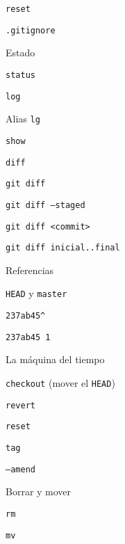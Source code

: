 \begin{longenum}
\begin{longenum}
\begin{longenum}
            \item \texttt{reset}
            \item \texttt{.gitignore}
        \end{longenum}
        \item Estado
        \begin{longenum}
            \item \texttt{status}
            \item \texttt{log}
            \item Alias \texttt{lg}
            \item \texttt{show}
            \item \texttt{diff}
            \begin{longenum}
                \item \texttt{git diff}
                \item \texttt{git diff --staged}
                \item \texttt{git diff <commit>}
                \item \texttt{git diff inicial..final}
            \end{longenum}
            \item Referencias
            \begin{longenum}
                \item \texttt{HEAD} y \texttt{master}
                \item \texttt{237ab45\^}
                \item \texttt{237ab45~1}
            \end{longenum}
        \end{longenum}
        \item La máquina del tiempo
        \begin{longenum}
            \item \texttt{checkout} (mover el \texttt{HEAD})
            \item \texttt{revert}
            \item \texttt{reset}
            \item \texttt{tag}
            \item \texttt{--amend}
        \end{longenum}
        \item Borrar y mover
        \begin{longenum}
            \item \texttt{rm}
            \item \texttt{mv}
        \end{longenum}

\end{longenum}
\end{longenum}
